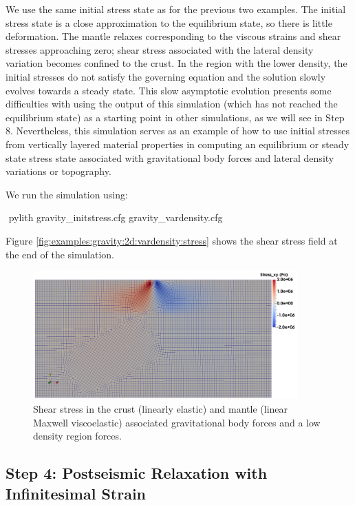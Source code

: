We use the same initial stress state as for the previous two examples.
The initial stress state is a close approximation to the equilibrium
state, so there is little deformation. The mantle relaxes
corresponding to the viscous strains and shear stresses approaching
zero; shear stress associated with the lateral density variation
becomes confined to the crust. In the region with the lower density,
the initial stresses do not satisfy the governing equation and the
solution slowly evolves towards a steady state. This slow asymptotic
evolution presents some difficulties with using the output of this
simulation (which has not reached the equilibrium state) as a starting
point in other simulations, as we will see in Step 8. Nevertheless,
this simulation serves as an example of how to use initial stresses
from vertically layered material properties in computing an
equilibrium or steady state stress state associated with gravitational
body forces and lateral density variations or topography.

We run the simulation using:
\begin{shell}
$$ pylith gravity_initstress.cfg gravity_vardensity.cfg
\end{shell}
Figure \vref{fig:examples:gravity:2d:vardensity:stress} shows the
shear stress field at the end of the simulation.

\begin{figure}
  \includegraphics[width=4in]{examples/figs/grav2d_vardensity-shearstress}
  \caption{Shear stress in the crust (linearly elastic) and mantle
    (linear Maxwell viscoelastic) associated gravitational body forces
    and a low density region forces.}
  \label{fig:examples:gravity:2d:vardensity:stress}
\end{figure}


\subsection{Step 4: Postseismic Relaxation with Infinitesimal Strain}

